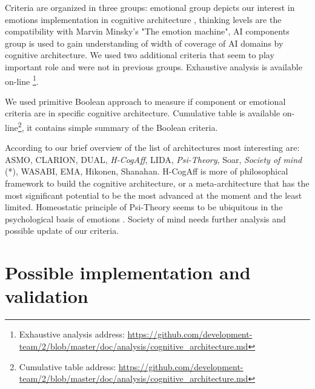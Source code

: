 Criteria are organized in three groups: emotional group depicts our interest in emotions implementation in cognitive architecture \cite{computationalmodelsemotionscognition}, thinking levels are the compatibility with Marvin Minsky's "The emotion machine", AI components group is used to gain understanding of width of coverage of AI domains by cognitive architecture. We used two additional criteria that seem to play important role and were not in previous groups. Exhaustive analysis is available on-line \footnote{Exhaustive analysis address: \url{https://github.com/development-team/2/blob/master/doc/analysis/cognitive_architecture.md}}.

We used primitive Boolean approach to measure if component or emotional criteria are in specific cognitive architecture. Cumulative table is available on-line\footnote{Cumulative table address: \url{https://github.com/development-team/2/blob/master/doc/analysis/cognitive_architecture.md}}, it contains simple summary of the Boolean criteria.

According to our brief overview of the list of architectures most interesting are: ASMO, CLARION, DUAL, \emph{H-CogAff}, LIDA, \emph{Psi-Theory}, Soar, \emph{Society of mind} (*), WASABI, EMA, Hikonen, Shanahan.
H-CogAff is more of philosophical framework to build the cognitive architecture, or a meta-architecture that has the most significant potential to be the most advanced at the moment and the least limited. Homeostatic principle of Psi-Theory seems to be ubiquitous in the psychological basis of emotions \cite{natureofemotions}. Society of mind needs further analysis and possible update of our criteria.

\section{Possible implementation and validation}

